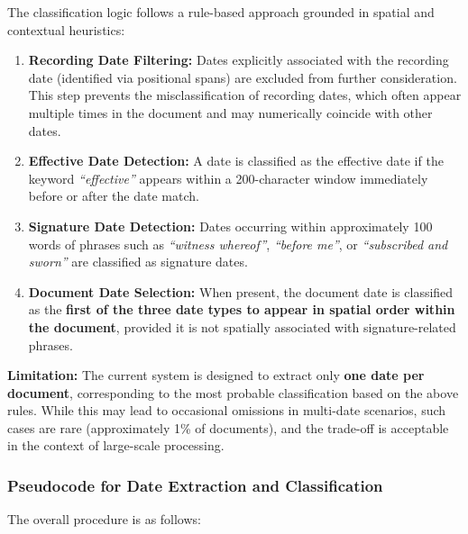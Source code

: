 \documentclass{article}
\begin{document}
The classification logic follows a rule-based approach grounded in spatial and contextual heuristics:
\begin{enumerate}
    \item \textbf{Recording Date Filtering:} Dates explicitly associated with the recording date (identified via positional spans) are excluded from further consideration. This step prevents the misclassification of recording dates, which often appear multiple times in the document and may numerically coincide with other dates.
    
    \item \textbf{Effective Date Detection:} A date is classified as the effective date if the keyword \textit{``effective''} appears within a 200-character window immediately before or after the date match.
    
    \item \textbf{Signature Date Detection:} Dates occurring within approximately 100 words of phrases such as \textit{``witness whereof''}, \textit{``before me''}, or \textit{``subscribed and sworn''} are classified as signature dates.
    
    \item \textbf{Document Date Selection:} When present, the document date is classified as the \textbf{first of the three date types to appear in spatial order within the document}, provided it is not spatially associated with signature-related phrases.
\end{enumerate}

\textbf{Limitation:} The current system is designed to extract only \textbf{one date per document}, corresponding to the most probable classification based on the above rules. While this may lead to occasional omissions in multi-date scenarios, such cases are rare (approximately 1\% of documents), and the trade-off is acceptable in the context of large-scale processing.

\subsubsection{Pseudocode for Date Extraction and Classification}

The overall procedure is as follows:
\end{document}
